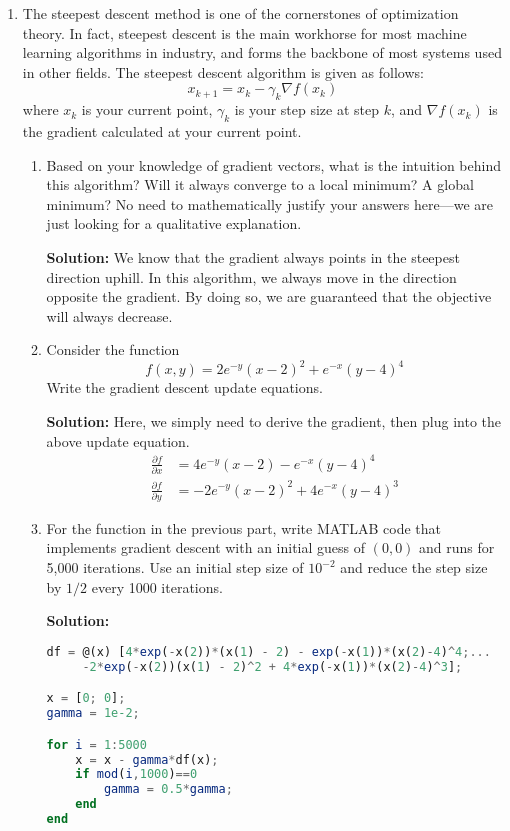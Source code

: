 \documentclass[letterpaper, 11pt]{article}
\begin{document}
\begin{enumerate}
\item The steepest descent method is one of the cornerstones of optimization theory. In fact, steepest descent is the main workhorse for most machine learning algorithms in industry, and forms the backbone of most systems used in other fields. The steepest descent algorithm is given as follows:
\[ x_{k+1} = x_k - \gamma_k \nabla f(x_k)\]
where $x_k$ is your current point, $\gamma_k$ is your step size at step $k$, and $\nabla f(x_k)$ is the gradient calculated at your current point.
\begin{enumerate}[label=(\alph*)]
\item Based on your knowledge of gradient vectors, what is the intuition behind this algorithm? Will it always converge to a local minimum? A global minimum? No need to mathematically justify your answers here---we are just looking for a qualitative explanation. 
\par \textbf{Solution:} We know that the gradient always points in the steepest direction uphill. In this algorithm, we always move in the direction opposite the gradient. By doing so, we are guaranteed that the objective will always decrease. 

\item Consider the function 
\[ f(x,y) = 2e^{-y}(x - 2)^2 + e^{-x}(y - 4)^4 \]
Write the gradient descent update equations. 
\par \textbf{Solution:} Here, we simply need to derive the gradient, then plug into the above update equation.
\begin{align*}
\frac{ \partial f}{\partial x } &= 4e^{-y}(x - 2) - e^{-x}(y-4)^4 \\
\frac{ \partial f}{\partial y } &= -2e^{-y}(x - 2)^2 + 4e^{-x}(y-4)^3 
\end{align*}

\item For the function in the previous part, write MATLAB code that implements gradient descent with an initial guess of $(0,0)$ and runs for 5,000 iterations. Use an initial step size of $10^{-2}$ and reduce the step size by $1/2$ every 1000 iterations. 
\par \textbf{Solution:}
\begin{lstlisting}[language = Octave]
df = @(x) [4*exp(-x(2))*(x(1) - 2) - exp(-x(1))*(x(2)-4)^4;...
	 -2*exp(-x(2))(x(1) - 2)^2 + 4*exp(-x(1))*(x(2)-4)^3];

x = [0; 0]; 
gamma = 1e-2;

for i = 1:5000
	x = x - gamma*df(x);
	if mod(i,1000)==0
		gamma = 0.5*gamma;
	end
end

\end{lstlisting}

\end{enumerate}


\end{enumerate}
\end{document}
